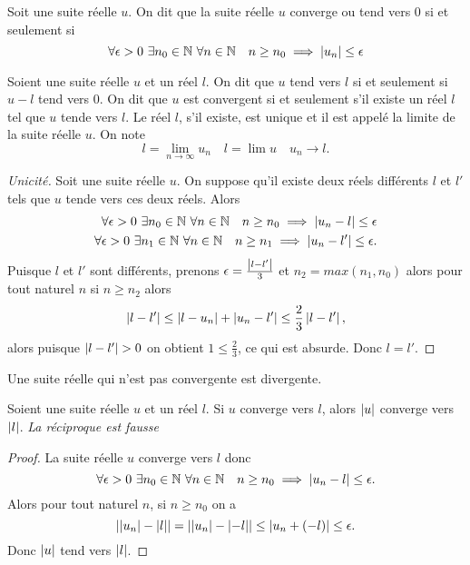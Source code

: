 \begin{defdef}
  Soit une suite réelle $u$. On dit que la suite réelle $u$ converge ou tend vers $0$ si et seulement si
  \begin{equation}
    \forall \epsilon >0 \ \exists n_0\in \N \ \forall n \in \N \quad n\geq n_0 \implies \abs{u_n}\leq \epsilon
  \end{equation}
\end{defdef}
\begin{defdef}
  Soient une suite réelle $u$ et un réel $l$. On dit que $u$ tend vers $l$ si et seulement si $u-l$ tend vers 0. On dit que $u$ est convergent si et seulement s'il existe un réel $l$ tel que $u$ tende vers $l$. Le réel $l$, s'il existe, est unique et il est appelé la limite de la suite réelle $u$. On note
  \begin{equation}
    l=\lim\limits_{n\to\infty} u_n \quad l=\lim u \quad u_n \rightarrow l.
  \end{equation}
\end{defdef}
\begin{proof}[Unicité]
  Soit une suite réelle $u$. On suppose qu'il existe deux réels différents $l$ et $l'$ tels que $u$ tende vers ces deux réels. Alors
  \begin{align}
    \forall \epsilon >0 \ \exists n_0\in \mathbb{N} \ \forall n\in\mathbb{N} \quad n\geq n_0 \implies \left\lvert u_n-l\right\rvert\leq \epsilon \\ 
    \forall \epsilon >0 \ \exists n_1\in \mathbb{N} \ \forall n\in\mathbb{N} \quad n\geq n_1 \implies \left\lvert u_n-l'\right\rvert\leq \epsilon.
  \end{align}
  Puisque $l$ et $l'$ sont différents, prenons $\epsilon=\frac{\left\lvert l-l'\right\rvert}{3}$ et $n_2=max(n_1,n_0)$ alors pour tout naturel $n$ si $n\geq n_2$ alors
\begin{equation}
  \left\lvert l-l'\right\rvert\leq \left\lvert l-u_n\right\rvert+\left\lvert u_n-l'\right\rvert\leq \frac{2}{3} \left\lvert l-l'\right\rvert,
\end{equation}
alors puisque $\left\lvert l-l'\right\rvert>0$ on obtient $1\leq \frac{2}{3}$, ce qui est absurde. Donc $l=l'$.
\end{proof}
\begin{defdef}
  Une suite réelle qui n'est pas convergente est divergente.
\end{defdef}
\begin{prop}
  Soient une suite réelle $u$ et un réel $l$. Si $u$ converge vers $l$, alors $\left\lvert u\right\rvert$ converge vers $\left\lvert l\right\rvert$. \emph{La réciproque est fausse}
\end{prop}
\begin{proof}
  La suite réelle $u$ converge vers $l$ donc
  \begin{equation}
    \forall \epsilon>0 \ \exists n_0 \in \mathbb{N} \ \forall n \in \mathbb{N} \quad n\geq n_0 \implies \left\lvert u_n-l\right\rvert\leq \epsilon.
  \end{equation}
  Alors pour tout naturel $n$, si $n\geq n_0$ on a
  \begin{equation}
    \left\lvert\left\lvert u_n\right\rvert-\left\lvert l\right\rvert\right\rvert=\left\lvert\left\lvert u_n\right\rvert-\left\lvert-l\right\rvert\right\rvert\leq \left\lvert u_n+(-l)\right\rvert\leq \epsilon.
  \end{equation}
  Donc $\left\lvert u\right\rvert$ tend vers $\left\lvert l\right\rvert$.
\end{proof}
